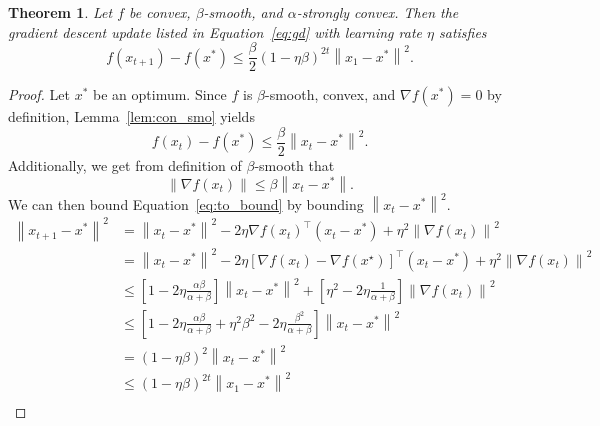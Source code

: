 \documentclass{article}
\newcommand{\norm}[1]{\left\| #1 \right\| }
\newtheorem{theorem}{Theorem}
\theoremstyle{definition}
\begin{document}
\begin{theorem}
    Let $f$ be convex, $\beta$-smooth, and $\alpha$-strongly convex. Then the
    gradient descent update listed in Equation~\ref{eq:gd} with learning rate
    $\eta$ satisfies
    \begin{equation}
        f(x_{t+1}) - f(x^*) \leq \frac{\beta}{2} {\left( 1 - \eta \beta
        \right)}^{2t} \norm{x_1 - x^*}^2.
    \end{equation}
\end{theorem}

\begin{proof}
    Let $x^*$ be an optimum. Since $f$ is $\beta$-smooth, convex, and
    $\nabla f(x^*) = 0$ by definition, Lemma~\ref{lem:con_smo} yields
    \begin{equation}
        \label{eq:to_bound}
        f(x_t) - f(x^*) \leq \frac{\beta}{2} \norm{x_t - x^*}^2.
    \end{equation}
    Additionally, we get from definition of $\beta$-smooth that 
    \begin{equation}
        \norm{\nabla f(x_t)} \leq \beta \norm{x_t - x^*}.
    \end{equation}
    We can then bound Equation~\ref{eq:to_bound} by bounding $\norm{x_t - x^*}^2$.
    \begin{equation}
        \begin{aligned}
            \norm{x_{t + 1} - x^*}^2 &= \norm{x_t - x^*}^2 - 2\eta {\nabla
            f(x_t)}^\intercal (x_t - x^*) + \eta^2 \norm{\nabla f(x_t)}^2 \\
            &= \norm{x_t - x^*}^2 - 2\eta {[\nabla
            f(x_t) - \nabla f(x^\star)]}^\intercal (x_t - x^*) + \eta^2
            \norm{\nabla f(x_t)}^2 \\
            &\leq \left[ 1 - 2\eta \frac{\alpha \beta}{\alpha + \beta}
            \right]\norm{x_t - x^*}^2 + \left[  \eta^2  - 2\eta\frac{1}{\alpha +
            \beta} \right]\norm{\nabla f(x_t)}^2\\
            &\leq \left[ 1 - 2\eta \frac{\alpha \beta}{\alpha + \beta}
              + \eta^2\beta^2  - 2\eta\frac{\beta^2}{\alpha +
            \beta} \right]\norm{x_t - x^*}^2 \\
            &= {\left( 1 -  \eta\beta  \right)}^2\norm{x_t - x^*}^2 \\
            &\leq {\left( 1 -  \eta\beta  \right)}^{2t}\norm{x_1 - x^*}^2 \\
        \end{aligned}
    \end{equation}
\end{proof}





\end{document}
